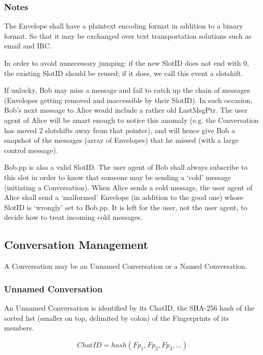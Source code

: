 \documentclass[a4paper,11pt]{article}
\begin{document}
\subsubsection{Notes}

\begin{compactitem}
    \item The Envelope shall have a plaintext encoding format in addition to a binary format. So that it may be exchanged over text transportation solutions such as email and IRC.
    \item In order to avoid unnecessary jumping: if the new SlotID does not end with 0, the existing SlotID should be reused; if it does, we call this event a slotshift.
    \item If unlucky, Bob may miss a message and fail to catch up the chain of messages (Envelopes getting removed and inaccessible by their SlotID). In such occasion, Bob's next message to Alice would include a rather old LastMsgPtr. The user agent of Alice will be smart enough to notice this anomaly (e.g. the Conversation has moved 2 slotshifts away from that pointer), and will hence give Bob a snapshot of the messages (array of Envelopes) that he missed (with a large control message).
    \item Bob.pp is also a valid SlotID. The user agent of Bob shall always subscribe to this slot in order to know that someone may be sending a `cold' message (initiating a Conversation). When Alice sends a cold message, the user agent of Alice shall send a `malformed' Envelope (in addition to the good one) whose SlotID is `wrongly' set to Bob.pp. It is left for the user, not the user agent, to decide how to treat incoming cold messages.
\end{compactitem}


\subsection{Conversation Management}
A Conversation may be an Unnamed Conversation or a Named Conversation.

\subsubsection{Unnamed Conversation}
An Unnamed Conversation is identified by its ChatID, the SHA-256 hash of the sorted list (smaller on top, delimited by colon) of the Fingerprints of its members.

$$
	ChatID = hash( Fp_{1} , Fp_{2} , Fp_{3} , \ldots )
$$
\end{document}
